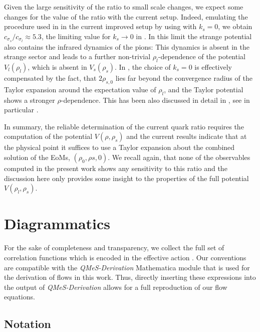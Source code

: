 \documentclass[aps,twocolumn,prd,superscriptaddress]{revtex4-2}
\begin{document}
Given the large sensitivity of the ratio to small scale changes, we expect some changes for the value of the ratio with the current setup. Indeed, emulating the procedure used in \cite{Fu:2019hdw} in the current improved setup by using  with $k_s=0$, we obtain ${c_{\sigma_ s}}/{c_{\sigma_l}}\approx 5.3$, the limiting value for $k_s\to 0$ in . In this limit the strange potential also contains the infrared dynamics of the pions: This dynamics is absent in the strange sector and leads to a further non-trivial $\rho_l$-dependence of the potential $V_l(\rho_l)$, which is absent in $V_s(\rho_s)$. In \cite{Fu:2019hdw}, the choice of $k_s=0$ is effectively compensated by the fact, that $2\rho_{s,0}$ lies far beyond the convergence radius of the Taylor expansion around the expectation value of $\rho_l$, and the Taylor potential shows a stronger $\rho$-dependence. This has been also discussed in detail in , see in particular . 

In summary, the reliable determination of the current quark ratio requires the computation of the potential $V(\rho,\rho_s)$ and the current results indicate that at the physical point it suffices to use a Taylor expansion about the combined solution of the EoMs, $(\rho_0,\rho{s,0})$. We recall again, that none of the observables computed in the present work shows any sensitivity to this ratio and the discussion here only provides some insight to the properties of the full potential $V(\rho_l, \rho_s)$. 


\section{Diagrammatics}
\label{app:Diagrammatics}

For the sake of completeness and transparency, we collect the full set of correlation functions which is encoded in the effective action . Our conventions are compatible with the \textit{QMeS-Derivation} Mathematica module \cite{Pawlowski:2022oyq} that is used for the derivation of flows in this work. Thus, directly inserting these expressions into the output of \textit{QMeS-Derivation} allows for a full reproduction of our flow equations.


\subsection{Notation}
\end{document}
